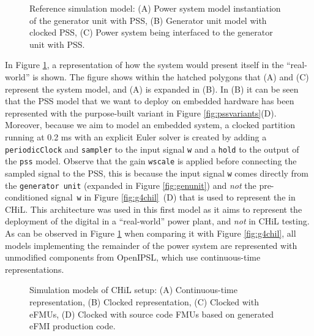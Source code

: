 \begin{figure}[b!]
    \centerline{}
    \vspace{-2ex}
    \caption{Reference simulation model: (A) Power system model instantiation of the generator unit with PSS, (B) Generator unit model with clocked PSS, (C) Power system being interfaced to the generator unit with PSS.}
    \vspace{-2ex}
    \label{fig:refsim}
\end{figure}

In Figure \ref{fig:refsim}, a representation of how the system would present itself in the ``real-world'' is shown. The figure shows within the hatched polygons that (A) and (C) represent the system model, and (A) is expanded in (B). In (B) it can be seen that the PSS \controller{} model that we want to deploy on embedded hardware has been represented with the purpose-built variant in Figure \ref{fig:pssvariants}(D). Moreover, because we aim to model an embedded system, a clocked partition running at 0.2 ms with an explicit Euler solver is created by adding a \texttt{periodicClock} and \texttt{sampler} to the input signal \texttt{w} and a \texttt{hold} to the output of the \texttt{pss} model. Observe that the gain \texttt{wscale} is applied before connecting the sampled signal to the PSS, this is because the input signal \texttt{w} comes directly from the \texttt{generator unit} (expanded in Figure \ref{fig:genunit}) and \emph{not} the pre-conditioned signal~\texttt{w} in Figure \ref{fig:g4chil}~(D) that is used to represent the \plant{} in CHiL. This architecture was used in this first model as it aims to represent the deployment of the digital \controller{} in a ``real-world'' power plant, and \emph{not} in CHiL testing. As can be observed in Figure \ref{fig:refsim} when comparing it with Figure \ref{fig:g4chil}, all models implementing the remainder of the power system are represented with unmodified components from OpenIPSL, which use continuous-time representations.

\begin{figure}[t!]
    \centerline{}
    \vspace{-2ex}
    \caption{Simulation models of CHiL setup: (A) Continuous-time representation, (B) Clocked representation, (C) Clocked with eFMUs, (D) Clocked with source code FMUs based on generated eFMI production code.}\label{fig:chilmodels}
    \vspace{-2ex}
\end{figure}

